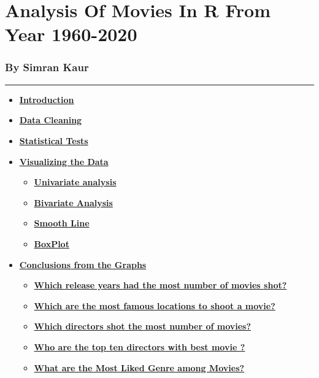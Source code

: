\documentclass[
]{article}
\author{}
\date{\vspace{-2.5em}}
\providecommand{\tightlist}{%
  \setlength{\itemsep}{0pt}\setlength{\parskip}{0pt}}
\begin{document}
\hypertarget{analysis-of-movies-in-r-from-year-1960-2020}{%
\section{\texorpdfstring{\textbf{Analysis Of Movies In R From Year
1960-2020}}{Analysis Of Movies In R From Year 1960-2020}}\label{analysis-of-movies-in-r-from-year-1960-2020}}

\hypertarget{by-simran-kaur}{%
\subsubsection{\texorpdfstring{\textbf{By Simran
Kaur}}{By Simran Kaur}}\label{by-simran-kaur}}

\begin{center}\rule{0.5\linewidth}{0.5pt}\end{center}

\begin{itemize}
\tightlist
\item
  \textbf{\protect\hyperlink{intro}{Introduction}}\\
\item
  \textbf{\protect\hyperlink{data}{Data Cleaning}}\\
\item
  \textbf{\protect\hyperlink{stats}{Statistical Tests}}\\
\item
  \textbf{\protect\hyperlink{visual}{Visualizing the Data}}

  \begin{itemize}
  \tightlist
  \item
    \textbf{\protect\hyperlink{uni}{Univariate analysis}}\\
  \item
    \textbf{\protect\hyperlink{bi}{Bivariate Analysis}}
  \item
    \textbf{\protect\hyperlink{smooth}{Smooth Line}}\\
  \item
    \textbf{\protect\hyperlink{box}{BoxPlot}}\\
  \end{itemize}
\item
  \textbf{\protect\hyperlink{conclusion}{Conclusions from the Graphs}}

  \begin{itemize}
  \tightlist
  \item
    \textbf{\protect\hyperlink{q1}{Which release years had the most
    number of movies shot?}}
  \item
    \textbf{\protect\hyperlink{q2}{Which are the most famous locations
    to shoot a movie?}}
  \item
    \textbf{\protect\hyperlink{q3}{Which directors shot the most number
    of movies?}}
  \item
    \textbf{\protect\hyperlink{q4}{Who are the top ten directors with
    best movie ?}}
  \item
    \textbf{\protect\hyperlink{q5}{What are the Most Liked Genre among
    Movies?}}
  \end{itemize}
\end{itemize}
\end{document}
